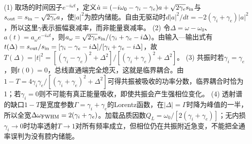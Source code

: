 (1) 取场的时间因子\(e^{-i\omega t}\)，定义\(\dot a=(-i\omega_0-\gamma_i-\gamma_e)a+\sqrt{2\gamma_e}s_{\rm in}\)与\(s_{\rm out}=s_{\rm in}-\sqrt{2\gamma_e}a\)，使\(|a|^2\)为腔内储能。自由无驱动时\(d|a|^2/dt=-2(\gamma_i+\gamma_e)|a|^2\)，所以这里\(\gamma\)表示振幅衰减率，而非能量衰减率。
(2) 令\(\Delta=\omega-\omega_0\)、\(a(t)=a_\omega e^{-i\omega t}\)，则\(a_\omega=\sqrt{2\gamma_e}s_{\rm in}/(\gamma_i+\gamma_e-i\Delta)\)。由输入—输出式有\(t(\Delta)=s_{\rm out}/s_{\rm in}=[\gamma_i-\gamma_e-i\Delta]/[\gamma_i+\gamma_e-i\Delta]\)，故\(T(\Delta)=|t|^2=[(\gamma_i-\gamma_e)^2+\Delta^2]/[(\gamma_i+\gamma_e)^2+\Delta^2]\)。
(3) 共振时若\(\gamma_i=\gamma_e\)，则\(t(0)=0\)，总线直通端完全熄灭，这就是临界耦合。由\(1-T=4\gamma_i\gamma_e/[(\gamma_i+\gamma_e)^2+\Delta^2]\)可得共振被吸收的功率分数，临界耦合时恰为1；若\(\gamma_i=0\)则不可能有真正能量吸收，即使共振会产生强相位变化。
(4) 透射谱的缺口\(1-T\)是宽度参数\(\Gamma=\gamma_i+\gamma_e\)的Lorentz函数，在\(|\Delta|=\Gamma\)时降为峰值的一半，所以全宽\(\Delta\omega_{\rm FWHM}=2(\gamma_i+\gamma_e)\)。加载品质因数\(Q_L=\omega_0/[2(\gamma_i+\gamma_e)]\)；无内损\(\gamma_i\to0\)时功率透射\(T\to1\)对所有频率成立，但相位仍在共振附近急变，不能把全通率误判为没有腔内储能。
